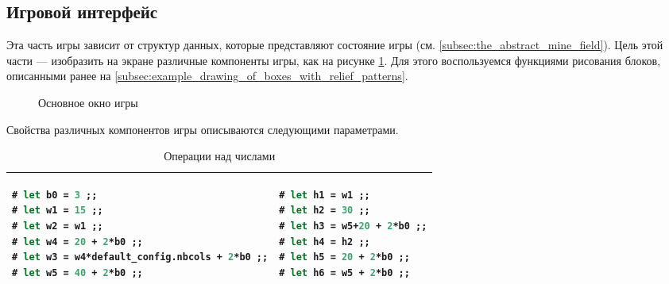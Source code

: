 \subsection{Игровой интерфейс}
\label{subsec:displaying_the_minesweeper_game}

Эта часть игры зависит от структур данных, которые представляют состояние игры 
(см. \ref{subsec:the_abstract_mine_field}). Цель этой части --- изобразить на 
экране различные компоненты игры, как на рисунке 
\ref{fig:the_main_window_of_minesweeper}. Для этого воспользуемся функциями 
рисования блоков, описанными ранее на 
\ref{subsec:example_drawing_of_boxes_with_relief_patterns}.

\begin{figure}[h]
	\caption{\label{fig:the_main_window_of_minesweeper}Основное окно игры}
\end{figure}

Свойства различных компонентов игры описываются следующими параметрами. 

\begin{table}[hl]
\begin{center}
	\label{tbl:operations_on_numbers}
	\caption{Операции над числами}
	\begin{tabular}{|p{7.2cm}|p{7.2cm}|}
	\hline
{\begin{lstlisting}[language=OCaml,frame=none]
# let b0 = 3 ;;
# let w1 = 15 ;;
# let w2 = w1 ;;
# let w4 = 20 + 2*b0 ;;
# let w3 = w4*default_config.nbcols + 2*b0 ;;
# let w5 = 40 + 2*b0 ;;
\end{lstlisting}}
 &
{\begin{lstlisting}[language=OCaml,frame=none]
# let h1 = w1 ;;
# let h2 = 30 ;;
# let h3 = w5+20 + 2*b0 ;;
# let h4 = h2 ;;
# let h5 = 20 + 2*b0 ;;
# let h6 = w5 + 2*b0 ;;
\end{lstlisting}}
\\
	\hline
	\end{tabular}
\end{center}
\end{table}

